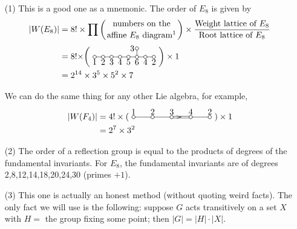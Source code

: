  \begin{itemize}
 \item[(1)] This is a good one as a mnemonic. The order of $E_8$ is given by
 \begin{align*}
   |W(E_8)| &= 8! \times \prod\left(
        \genfrac{}{}{0em}{}{\text{numbers on the}}{\text{affine $E_8$
        diagram\footnotemark}}
    \right) \times \frac{\text{Weight lattice of $E_8$}}{\text{Root lattice of $E_8$}}\\
    &= 8! \times
        \biggr( \begin{xy}
       <1em,0em>:
       (0,0) *+!U{1} *\cir<2pt>{};
       (1,0) *+!U{2} *\cir<2pt>{} **@{-};
       p+(1,0) *+!U{3} *\cir<2pt>{} **@{-};
       p+(1,0) *+!U{4} *\cir<2pt>{} **@{-};
       p+(1,0) *+!U{5} *\cir<2pt>{} **@{-};
       p+(1,0) *+!U{6} *\cir<2pt>{} **@{-};
       p+(0,1) *+!R{3} *\cir<2pt>{} **@{-},
       p+(1,0) *+!U{4} *\cir<2pt>{} **@{-};
       p+(1,0) *+!U{2} *\cir<2pt>{} **@{-};
       \end{xy}\biggr)
       \times 1\\
    &= 2^{14} \times 3^5\times 5^2\times 7
 \end{align*}

 We can do the same thing for any other Lie algebra, for example,
 \begin{align*}
   |W(F_4)| &= 4!\times (
   \begin{xy}
   <2.25em,0em>:
   (0,0) *+!D{1} *\cir<2pt>{};
   (1,0) *+!D{2} *\cir<2pt>{} **@{-};
   p+(1,0) *+!D{3} *\cir<2pt>{} **@{-};
   p+(1,0)="x" *+!D{4} *\cir<2pt>{} **@{=} ?*@{>};
   "x" *{\hspace{4pt}};p+(1,0) *+!D{2} *\cir<2pt>{} **@{-};
   \end{xy}
   ) \times 1\\
   &=2^7 \times 3^2
 \end{align*}

 \item[(2)] The order of a reflection group is equal to the products of degrees of the
 fundamental invariants. For $E_8$, the fundamental invariants are of degrees
 2,8,12,14,18,20,24,30 (primes $+1$).

 \item[(3)] This one is actually an honest method (without quoting weird facts). The
 only fact we will use is the following: suppose $G$ acts transitively on a set $X$
 with $H=$ the group fixing some point; then $|G|=|H|\cdot |X|$.


\end{itemize}
